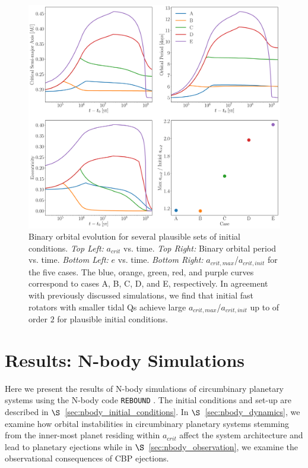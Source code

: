 \begin{figure}[t]
	\includegraphics[width=\textwidth]{opt.pdf}
   \caption{Binary orbital evolution for several plausible sets of initial conditions. {\it Top Left:} $a_{crit}$ vs. time.  {\it Top Right:} Binary orbital period vs. time. {\it Bottom Left:} $e$ vs. time. {\it Bottom Right:} $a_{crit,max}$/$a_{crit,init}$ for the five cases.  The blue, orange, green, red, and purple curves correspond to cases A, B, C, D, and E, respectively.  In agreement with previously discussed simulations, we find that initial fast rotators with smaller tidal Qs achieve large $a_{crit,max}$/$a_{crit,init}$ up to of order $2$ for plausible initial conditions.}
    \label{fig:opt}
\end{figure}

\section{Results: N-body Simulations} \label{sec:nbody_results}

Here we present the results of N-body simulations of circumbinary planetary systems using the N-body code \texttt{REBOUND} \citep{Rein2012,Rein2015}.  The initial conditions and set-up are described in $\S$~\ref{sec:nbody_initial_conditions}.  In $\S$~\ref{sec:nbody_dynamics}, we examine how orbital instabilities in circumbinary planetary systems stemming from the inner-most planet residing within $a_{crit}$ affect the system architecture and lead to planetary ejections while in $\S$~\ref{sec:nbody_observation}, we examine the observational consequences of CBP ejections.

